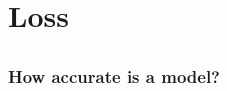 \section{Loss}

\subsection{}

\begin{frame}
    \frametitle{How accurate is a model?}
    
\end{frame}

